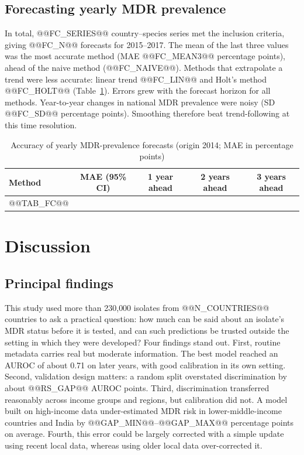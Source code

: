 \documentclass[11pt,a4paper]{article}
\begin{document}
\subsection{Forecasting yearly MDR prevalence}
In total, @@FC_SERIES@@ country--species series met the inclusion criteria, giving @@FC_N@@ forecasts for 2015--2017. The mean of the last three values was the most accurate method (MAE @@FC_MEAN3@@ percentage points), ahead of the naive method (@@FC_NAIVE@@). Methods that extrapolate a trend were less accurate: linear trend @@FC_LIN@@ and Holt's method @@FC_HOLT@@ (Table~\ref{tab:fc}). Errors grew with the forecast horizon for all methods. Year-to-year changes in national MDR prevalence were noisy (SD @@FC_SD@@ percentage points). Smoothing therefore beat trend-following at this time resolution.

\begin{table}[t]
\caption{Accuracy of yearly MDR-prevalence forecasts (origin 2014; MAE in percentage points)}\label{tab:fc}
\centering\footnotesize
\begin{tabular}{lcccc}
\toprule
Method & MAE (95\% CI) & 1 year ahead & 2 years ahead & 3 years ahead \\
\midrule
@@TAB_FC@@
\bottomrule
\end{tabular}
\end{table}

\section{Discussion}\label{sec:discussion}
\subsection{Principal findings}
This study used more than 230{,}000 isolates from @@N_COUNTRIES@@ countries to ask a practical question: how much can be said about an isolate's MDR status before it is tested, and can such predictions be trusted outside the setting in which they were developed? Four findings stand out. First, routine metadata carries real but moderate information. The best model reached an AUROC of about 0.71 on later years, with good calibration in its own setting. Second, validation design matters: a random split overstated discrimination by about @@RS_GAP@@ AUROC points. Third, discrimination transferred reasonably across income groups and regions, but calibration did not. A model built on high-income data under-estimated MDR risk in lower-middle-income countries and India by @@GAP_MIN@@--@@GAP_MAX@@ percentage points on average. Fourth, this error could be largely corrected with a simple update using recent local data, whereas using older local data over-corrected it.
\end{document}
